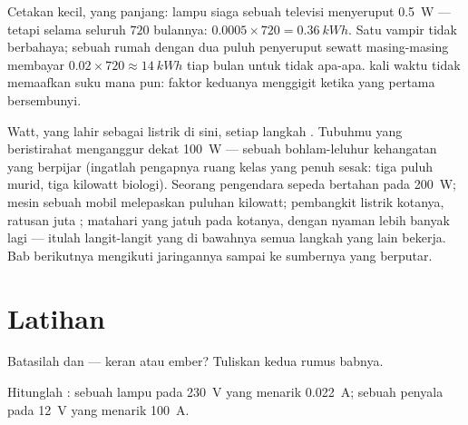\begin{example}\label{ex:g9:electric-power-energy:standby}
Cetakan kecil,  yang panjang: lampu siaga sebuah televisi
menyeruput \qty{0.5}{W} --- tetapi selama seluruh $720$  bulannya:
$0.0005 \times 720 = \qty{0.36}{kWh}$. Satu vampir tidak berbahaya;
sebuah rumah dengan dua puluh penyeruput sewatt masing-masing membayar
$0.02 \times 720 \approx \qty{14}{kWh}$ tiap bulan untuk tidak apa-apa.
 kali waktu tidak memaafkan suku mana pun: faktor keduanya
menggigit ketika yang pertama bersembunyi.
\end{example}

\begin{remark}\label{rem:g9:electric-power-energy:wider}
Watt, yang lahir sebagai  listrik di sini,  setiap
langkah . Tubuhmu yang beristirahat menganggur dekat
\qty{100}{W} --- sebuah bohlam-leluhur kehangatan yang berpijar
(ingatlah pengapnya ruang kelas yang penuh sesak: tiga puluh murid,
tiga kilowatt biologi). Seorang pengendara sepeda bertahan pada
\qty{200}{W}; mesin sebuah mobil melepaskan puluhan kilowatt;
pembangkit listrik kotanya, ratusan juta ;  matahari yang
jatuh pada kotanya, dengan nyaman lebih banyak lagi --- itulah
langit-langit yang di bawahnya semua langkah yang lain bekerja. Bab
berikutnya mengikuti  jaringannya sampai ke sumbernya yang
berputar.
\end{remark}

\section{Latihan}

\begin{exercise}[$\star$]\label{exo:g9:electric-power-energy:1}
Batasilah  dan  --- keran atau ember? Tuliskan kedua
rumus babnya.
\end{exercise}

\begin{exercise}[$\star$]\label{exo:g9:electric-power-energy:2}
Hitunglah : sebuah lampu pada \qty{230}{V} yang menarik
\qty{0.022}{A}; sebuah  penyala pada \qty{12}{V} yang menarik
\qty{100}{A}.
\end{exercise}


